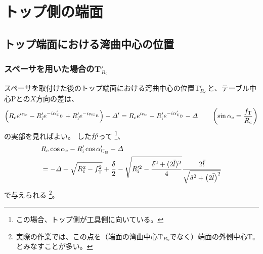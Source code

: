 \section{トップ側の端面}



\subsection{トップ端面における湾曲中心の位置}


\subsubsection{スペーサを用いた場合のT\texorpdfstring{$_{R_\text c}'$}{Rc'}}
スペーサを取付けた後のトップ端面における湾曲中心の位置T$_{R_\text c}'$と、テーブル中心Pとの$X$方向の差は、
\begin{align*}
  \left(
    R_\text ce^{i\alpha_\text c}-R_\text i'e^{-i\alpha'_{\text U_\text B}}+R_\text i'e^{-i\alpha_{\text U_\text B}}
  \right)
  -\varDelta'
  = R_\text ce^{i\alpha_\text c}-R_\text i'e^{-i\alpha'_{\text U_\text B}}-\varDelta \qquad
    \left(\sin\alpha_\text c = \frac{f_\text T}{R_\text c}\right)
\end{align*}
の実部を見ればよい。
したがって
\footnote{この場合、トップ側が工具側に向いている。}、
\begin{align}
  \notag
  &  R_\text c\cos\alpha_\text c-R_\text i'\cos\alpha'_{\text U_\text B}-\varDelta\\
  &= -\varDelta+\sqrt{R_\text c^2-f_\text T^2}+\frac\delta2
     -\sqrt{R_\text i'^2-\frac{\delta^2+(2\bar l)^2}4}\frac{2\bar l}{\sqrt{\delta^2+\left(2\bar l\right)^2}}
     \label{eq:spacerTRc}
\end{align}
で与えられる
\footnote{実際の作業では、この点を（端面の湾曲中心T$_{R_\text c}\!$でなく）端面の外側中心T$_\text c$とみなすことが多い。}。


